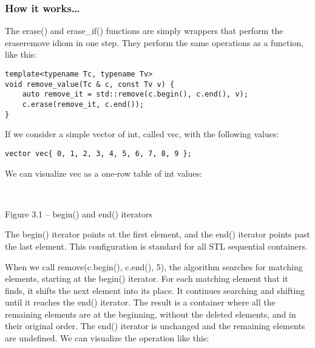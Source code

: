 \subsubsection{How it works…}

The erase() and erase\_if() functions are simply wrappers that perform the eraseremove idiom in one step. They perform the same operations as a function, like this:

\begin{lstlisting}[style=styleCXX]
template<typename Tc, typename Tv>
void remove_value(Tc & c, const Tv v) {
	auto remove_it = std::remove(c.begin(), c.end(), v);
	c.erase(remove_it, c.end());
}
\end{lstlisting}

If we consider a simple vector of int, called vec, with the following values:

\begin{lstlisting}[style=styleCXX]
vector vec{ 0, 1, 2, 3, 4, 5, 6, 7, 8, 9 };
\end{lstlisting}

We can visualize vec as a one-row table of int values:

\hspace*{\fill} \\ %
\begin{center}

Figure 3.1 – begin() and end() iterators
\end{center}

The begin() iterator points at the first element, and the end() iterator points past the last element. This configuration is standard for all STL sequential containers.

When we call remove(c.begin(), c.end(), 5), the algorithm searches for matching elements, starting at the begin() iterator. For each matching element that it finds, it shifts the next element into its place. It continues searching and shifting until it reaches the end() iterator. The result is a container where all the remaining elements are at the beginning, without the deleted elements, and in their original order. The end() iterator is unchanged and the remaining elements are undefined. We can visualize the operation like this:

